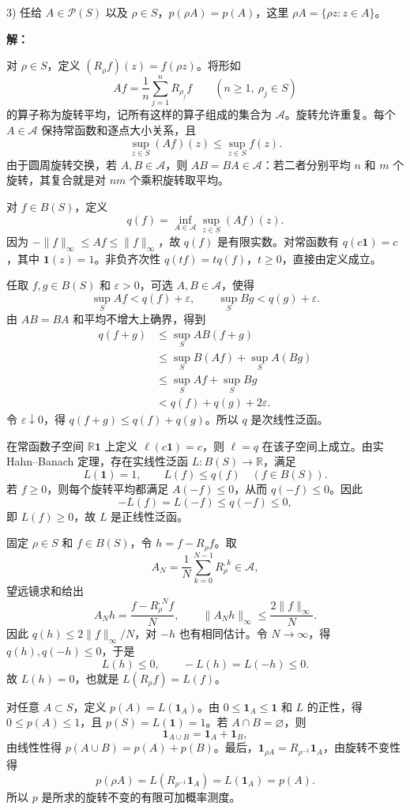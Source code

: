 \documentclass{article}
\begin{document}
3) 任给 $A\in\mathcal P(S)$ 以及 $\rho\in S$，$p(\rho A)=p(A)$，这里 $\rho A=\{\rho z:z\in A\}$。

\textbf{解：}

对 $\rho\in S$，定义 $(R_\rho f)(z)=f(\rho z)$。将形如
\[
Af=\frac1n\sum_{j=1}^n R_{\rho_j}f
\qquad(n\ge1,\ \rho_j\in S)
\]
的算子称为旋转平均，记所有这样的算子组成的集合为 $\mathcal A$。旋转允许重复。每个 $A\in\mathcal A$ 保持常函数和逐点大小关系，且
\[
\sup_{z\in S}(Af)(z)\le\sup_{z\in S}f(z).
\]
由于圆周旋转交换，若 $A,B\in\mathcal A$，则 $AB=BA\in\mathcal A$：若二者分别平均 $n$ 和 $m$ 个旋转，其复合就是对 $nm$ 个乘积旋转取平均。

对 $f\in B(S)$，定义
\[
q(f)=\inf_{A\in\mathcal A}\sup_{z\in S}(Af)(z).
\]
因为 $-\|f\|_\infty\le Af\le\|f\|_\infty$，故 $q(f)$ 是有限实数。对常函数有 $q(c\mathbf1)=c$，其中 $\mathbf1(z)=1$。非负齐次性 $q(tf)=tq(f)$，$t\ge0$，直接由定义成立。

任取 $f,g\in B(S)$ 和 $\varepsilon>0$，可选 $A,B\in\mathcal A$，使得
\[
\sup_S Af<q(f)+\varepsilon,\qquad
\sup_S Bg<q(g)+\varepsilon.
\]
由 $AB=BA$ 和平均不增大上确界，得到
\[
\begin{aligned}
q(f+g)&\le\sup_S AB(f+g)\\
&\le\sup_S B(Af)+\sup_S A(Bg)\\
&\le\sup_S Af+\sup_S Bg\\
&<q(f)+q(g)+2\varepsilon.
\end{aligned}
\]
令 $\varepsilon\downarrow0$，得 $q(f+g)\le q(f)+q(g)$。所以 $q$ 是次线性泛函。

在常函数子空间 $\mathbb R\mathbf1$ 上定义 $\ell(c\mathbf1)=c$，则 $\ell=q$ 在该子空间上成立。由实 Hahn--Banach 定理，存在实线性泛函 $L:B(S)\to\mathbb R$，满足
\[
L(\mathbf1)=1,\qquad L(f)\le q(f)\quad(f\in B(S)).
\]
若 $f\ge0$，则每个旋转平均都满足 $A(-f)\le0$，从而 $q(-f)\le0$。因此
\[
-L(f)=L(-f)\le q(-f)\le0,
\]
即 $L(f)\ge0$，故 $L$ 是正线性泛函。

固定 $\rho\in S$ 和 $f\in B(S)$，令 $h=f-R_\rho f$。取
\[
A_N=\frac1N\sum_{k=0}^{N-1}R_\rho^{,k}\in\mathcal A,
\]
望远镜求和给出
\[
A_Nh=\frac{f-R_\rho^{,N}f}{N},\qquad
\|A_Nh\|_\infty\le\frac{2\|f\|_\infty}{N}.
\]
因此 $q(h)\le2\|f\|_\infty/N$，对 $-h$ 也有相同估计。令 $N\to\infty$，得 $q(h),q(-h)\le0$，于是
\[
L(h)\le0,\qquad -L(h)=L(-h)\le0.
\]
故 $L(h)=0$，也就是 $L(R_\rho f)=L(f)$。

对任意 $A\subset S$，定义 $p(A)=L(\mathbf1_A)$。由 $0\le\mathbf1_A\le\mathbf1$ 和 $L$ 的正性，得 $0\le p(A)\le1$，且 $p(S)=L(\mathbf1)=1$。若 $A\cap B=\varnothing$，则
\[
\mathbf1_{A\cup B}=\mathbf1_A+\mathbf1_B,
\]
由线性性得 $p(A\cup B)=p(A)+p(B)$。最后，$\mathbf1_{\rho A}=R_{\rho^{-1}}\mathbf1_A$，由旋转不变性得
\[
p(\rho A)=L(R_{\rho^{-1}}\mathbf1_A)=L(\mathbf1_A)=p(A).
\]
所以 $p$ 是所求的旋转不变的有限可加概率测度。
\end{document}
